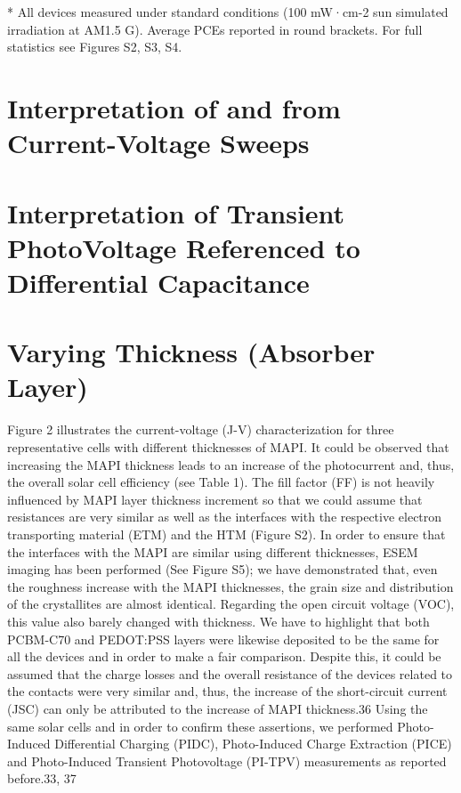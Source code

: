 * All devices measured under standard conditions (100 mW·cm-2 sun simulated irradiation at AM1.5 G). Average PCEs reported in round brackets. For full statistics see Figures S2, S3, S4.







\section{Interpretation of  and  from Current-Voltage Sweeps}

\section{Interpretation of Transient PhotoVoltage Referenced to Differential Capacitance}\label{interpretation_tpvdc}

\section{Varying  Thickness (Absorber Layer)}

Figure 2 illustrates the current-voltage (J-V) characterization for three representative cells with different thicknesses of MAPI. It could be observed that increasing the MAPI thickness leads to an increase of the photocurrent and, thus, the overall solar cell efficiency (see Table 1). The fill factor (FF) is not heavily influenced by MAPI layer thickness increment so that we could assume that resistances are very similar as well as the interfaces with the respective electron transporting material (ETM) and the HTM (Figure S2). In order to ensure that the interfaces with the MAPI are similar using different thicknesses, ESEM imaging has been performed (See Figure S5); we have demonstrated that, even the roughness increase with the MAPI thicknesses, the grain size and distribution of the crystallites are almost identical.
Regarding the open circuit voltage (VOC), this value also barely changed with thickness. We have to highlight that both PCBM-C70 and PEDOT:PSS layers were likewise deposited to be the same for all the devices and in order to make a fair comparison. Despite this, it could be assumed that the charge losses and the overall resistance of the devices related to the contacts were very similar and, thus, the increase of the short-circuit current (JSC) can only be attributed to the increase of MAPI thickness.36 Using the same solar cells and in order to confirm these assertions, we performed Photo-Induced Differential Charging (PIDC), Photo-Induced Charge Extraction (PICE) and Photo-Induced Transient Photovoltage (PI-TPV) measurements as reported before.33, 37

